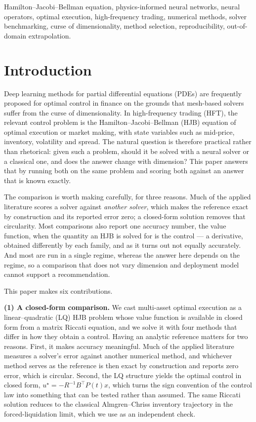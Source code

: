 \documentclass[conference]{IEEEtran}
\begin{document}
\begin{IEEEkeywords}
Hamilton--Jacobi--Bellman equation, physics-informed neural networks, neural operators, optimal
execution, high-frequency trading, numerical methods, solver benchmarking, curse of
dimensionality, method selection, reproducibility, out-of-domain extrapolation.
\end{IEEEkeywords}

\section{Introduction}

Deep learning methods for partial differential equations (PDEs) are frequently proposed for
optimal control in finance on the grounds that mesh-based solvers suffer from the curse of
dimensionality. In high-frequency trading (HFT), the relevant control problem is the
Hamilton--Jacobi--Bellman (HJB) equation of optimal execution or market making, with state
variables such as mid-price, inventory, volatility and spread. The natural question is
therefore practical rather than rhetorical: given such a problem, should it be solved with a neural
solver or a classical one, and does the answer change with dimension? This paper answers that by
running both on the same problem and scoring both against an answer that is known exactly.

The comparison is worth making carefully, for three reasons. Much of the applied literature scores
a solver against \emph{another solver}, which makes the reference exact by construction and its
reported error zero; a closed-form solution removes that circularity. Most comparisons also report
one accuracy number, the value function, when the quantity an HJB is solved for is the control ---
a derivative, obtained differently by each family, and as it turns out not equally accurately.
And most are run in a single regime, whereas the answer here depends on the regime, so a comparison
that does not vary dimension and deployment model cannot support a recommendation.

This paper makes six contributions.

\textbf{(1) A closed-form comparison.} We cast multi-asset optimal execution
as a linear--quadratic (LQ) HJB problem whose value function is available in closed form from
a matrix Riccati equation, and we solve it with four methods that differ in how they obtain a
control. Having an analytic reference matters for two reasons. First, it
makes accuracy meaningful. Much of the applied literature measures a solver's error against
another numerical method, and whichever method serves as the reference is then exact by
construction and reports zero error, which is circular. Second, the LQ structure yields the
optimal control in closed
form, $u^\star = -R^{-1}B^\top P(t)x$, which turns the sign convention of the control law
into something that can be tested rather than assumed. The same Riccati solution reduces to
the classical Almgren--Chriss inventory trajectory in the forced-liquidation limit, which we
use as an independent check.
\end{document}

